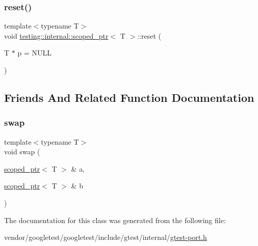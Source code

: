 \mbox{\label{classtesting_1_1internal_1_1scoped__ptr_acac03266a43359801aff0de5c990bec0}} 
\subsubsection{\texorpdfstring{reset()}{reset()}}
{\footnotesize\ttfamily template$<$typename T$>$ \\
void \hyperlink{classtesting_1_1internal_1_1scoped__ptr}{testing\+::internal\+::scoped\+\_\+ptr}$<$ T $>$\+::reset (\begin{DoxyParamCaption}\item[{T $\ast$}]{p = {\ttfamily NULL} }\end{DoxyParamCaption})\hspace{0.3cm}{\ttfamily [inline]}}



\subsection{Friends And Related Function Documentation}
\mbox{\label{classtesting_1_1internal_1_1scoped__ptr_a01bc0441e6a3ebf26807ac523392ca86}} 
\subsubsection{\texorpdfstring{swap}{swap}}
{\footnotesize\ttfamily template$<$typename T$>$ \\
void swap (\begin{DoxyParamCaption}\item[{\hyperlink{classtesting_1_1internal_1_1scoped__ptr}{scoped\+\_\+ptr}$<$ T $>$ \&}]{a,  }\item[{\hyperlink{classtesting_1_1internal_1_1scoped__ptr}{scoped\+\_\+ptr}$<$ T $>$ \&}]{b }\end{DoxyParamCaption})\hspace{0.3cm}{\ttfamily [friend]}}



The documentation for this class was generated from the following file\+:\begin{DoxyCompactItemize}
\item 
vendor/googletest/googletest/include/gtest/internal/\hyperlink{gtest-port_8h}{gtest-\/port.\+h}\end{DoxyCompactItemize}
